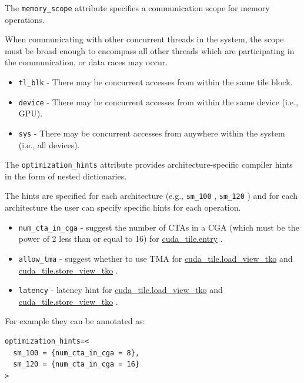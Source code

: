 \documentclass{article}
\begin{document}
The \texttt{memory\_scope} attribute specifies a communication scope for memory operations.

When communicating with other concurrent threads in the system, the scope must be broad enough to encompass all other threads which are participating in the communication, or data races may occur.


\begin{itemize}
\item \texttt{tl\_blk} - There may be concurrent accesses from within the same tile block.
\item \texttt{device} - There may be concurrent accesses from within the same device (i.e., GPU).
\item \texttt{sys} - There may be concurrent accesses from anywhere within the system (i.e., all devices).

\end{itemize}
The \texttt{optimization\_hints} attribute provides architecture-specific compiler hints in the form of nested dictionaries.


The hints are specified for each architecture (e.g., \texttt{sm\_100} , \texttt{sm\_120} ) and for each architecture the user can specify specific hints for each operation.


\begin{itemize}
\item \texttt{num\_cta\_in\_cga} - suggest the number of CTAs in a CGA (which must be the power of 2 less than or equal to 16) for \href{https://docs.nvidia.com/cuda/tile-ir/latest/sections/operations.html#op-cuda-tile-entry}{cuda\_tile.entry} .
\item \texttt{allow\_tma} - suggest whether to use TMA for \href{https://docs.nvidia.com/cuda/tile-ir/latest/sections/operations.html#op-cuda-tile-load-view-tko}{cuda\_tile.load\_view\_tko} and \href{https://docs.nvidia.com/cuda/tile-ir/latest/sections/operations.html#op-cuda-tile-store-view-tko}{cuda\_tile.store\_view\_tko} .
\item \texttt{latency} - latency hint for \href{https://docs.nvidia.com/cuda/tile-ir/latest/sections/operations.html#op-cuda-tile-load-view-tko}{cuda\_tile.load\_view\_tko} and \href{https://docs.nvidia.com/cuda/tile-ir/latest/sections/operations.html#op-cuda-tile-store-view-tko}{cuda\_tile.store\_view\_tko} .

\end{itemize}
For example they can be annotated as:


\begin{lstlisting}
optimization_hints=<
  sm_100 = {num_cta_in_cga = 8},
  sm_120 = {num_cta_in_cga = 16}
>
\end{lstlisting}
\end{document}
